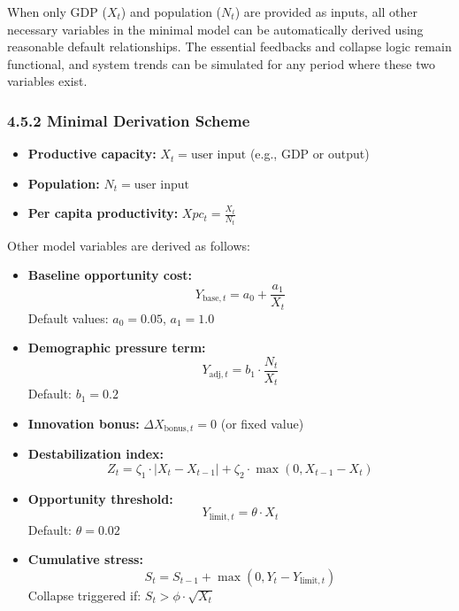 \documentclass[12pt]{report}
\begin{document}
When only GDP ($X_t$) and population ($N_t$) are provided as inputs, all other necessary variables in the minimal model can be automatically derived using reasonable default relationships. The essential feedbacks and collapse logic remain functional, and system trends can be simulated for any period where these two variables exist.

\subsubsection{4.5.2 Minimal Derivation Scheme}

\begin{itemize}
  \item \textbf{Productive capacity:} \quad $X_t = \text{user input}$ (e.g., GDP or output)
  \item \textbf{Population:} \quad $N_t = \text{user input}$
  \item \textbf{Per capita productivity:} \quad $Xpc_t = \frac{X_t}{N_t}$
\end{itemize}

\noindent
Other model variables are derived as follows:

\begin{itemize}
  \item \textbf{Baseline opportunity cost:}
  \begin{equation}
  Y_{\text{base},t} = a_0 + \frac{a_1}{X_t}
  \end{equation}
  Default values: $a_0 = 0.05$, $a_1 = 1.0$

  \item \textbf{Demographic pressure term:}
  \begin{equation}
  Y_{\text{adj},t} = b_1 \cdot \frac{N_t}{X_t}
  \end{equation}
  Default: $b_1 = 0.2$

  \item \textbf{Innovation bonus:} \quad $\Delta X_{\text{bonus},t} = 0$ (or fixed value)

  \item \textbf{Destabilization index:}
  \begin{equation}
  Z_t = \zeta_1 \cdot |X_t - X_{t-1}| + \zeta_2 \cdot \max(0, X_{t-1} - X_t)
  \end{equation}

  \item \textbf{Opportunity threshold:}
  \begin{equation}
  Y_{\text{limit},t} = \theta \cdot X_t
  \end{equation}
  Default: $\theta = 0.02$

  \item \textbf{Cumulative stress:}
  \begin{equation}
  S_t = S_{t-1} + \max(0, Y_t - Y_{\text{limit},t})
  \end{equation}
  Collapse triggered if: $S_t > \phi \cdot \sqrt{X_t}$
\end{itemize}
\end{document}
